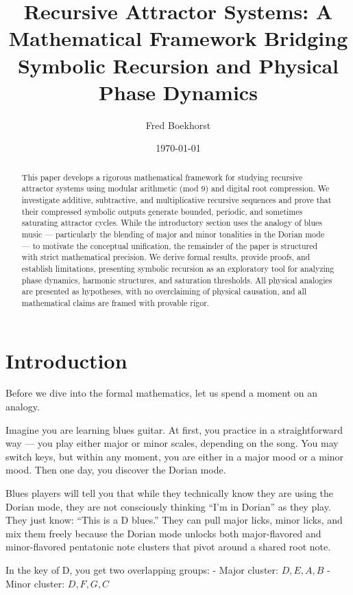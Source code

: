 \documentclass[12pt]{article}
\title{Recursive Attractor Systems:  
A Mathematical Framework Bridging Symbolic Recursion and Physical Phase Dynamics}
\author{Fred Boekhorst}
\date{\today}
\begin{document}
\maketitle

\begin{abstract}
This paper develops a rigorous mathematical framework for studying recursive attractor systems using modular arithmetic (mod 9) and digital root compression. We investigate additive, subtractive, and multiplicative recursive sequences and prove that their compressed symbolic outputs generate bounded, periodic, and sometimes saturating attractor cycles. While the introductory section uses the analogy of blues music — particularly the blending of major and minor tonalities in the Dorian mode — to motivate the conceptual unification, the remainder of the paper is structured with strict mathematical precision. We derive formal results, provide proofs, and establish limitations, presenting symbolic recursion as an exploratory tool for analyzing phase dynamics, harmonic structures, and saturation thresholds. All physical analogies are presented as hypotheses, with no overclaiming of physical causation, and all mathematical claims are framed with provable rigor.
\end{abstract}

\section{Introduction}

Before we dive into the formal mathematics, let us spend a moment on an analogy.

Imagine you are learning blues guitar. At first, you practice in a straightforward way — you play either major or minor scales, depending on the song. You may switch keys, but within any moment, you are either in a major mood or a minor mood. Then one day, you discover the Dorian mode.

Blues players will tell you that while they technically know they are using the Dorian mode, they are not consciously thinking “I’m in Dorian” as they play. They just know:  
“This is a D blues.”  
They can pull major licks, minor licks, and mix them freely because the Dorian mode unlocks both major-flavored and minor-flavored pentatonic note clusters that pivot around a shared root note.

In the key of D, you get two overlapping groups:  
- Major cluster: \( D, E, A, B \)  
- Minor cluster: \( D, F, G, C \)
\end{document}
